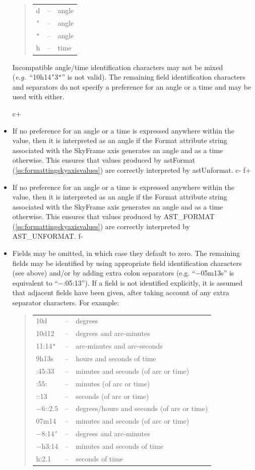 \documentclass[twoside,11pt]{article}
\newcommand{\secref}[1]{\S\ref{#1}}
\renewcommand{\secref}[1]{\ref{#1}}
\begin{document}
\begin{itemize}
\begin{quote}
\begin{tabular}{lll}
d & -- & angle \\
{\tt{'}} & -- & angle \\
{\tt{"}} & -- & angle \\
h & -- & time
\end{tabular}
\end{quote}

Incompatible angle/time identification characters may not be mixed
({\em{e.g.}}\ ``10h14{\tt{'}}3{\tt{"}}'' is not valid).  The remaining
field identification characters and separators do not specify a
preference for an angle or a time and may be used with either.

c+
\item If no preference for an angle or a time is expressed anywhere
within the value, then it is interpreted as an angle if the Format
attribute string associated with the SkyFrame axis generates an angle
and as a time otherwise.  This ensures that values produced by
astFormat (\secref{ss:formattingskyaxisvalues}) are correctly
interpreted by astUnformat.
c-
f+
\item If no preference for an angle or a time is expressed anywhere
within the value, then it is interpreted as an angle if the Format
attribute string associated with the SkyFrame axis generates an angle
and as a time otherwise.  This ensures that values produced by
AST\_FORMAT (\secref{ss:formattingskyaxisvalues}) are correctly
interpreted by AST\_UNFORMAT.
f-

\item Fields may be omitted, in which case they default to zero. The
remaining fields may be identified by using appropriate field
identification characters (see above) and/or by adding extra colon
separators (e.g. ``$-$05m13s'' is equivalent to ``$-$:05:13''). If a field
is not identified explicitly, it is assumed that adjacent fields have
been given, after taking account of any extra separator
characters. For example:

\begin{quote}
\begin{tabular}{lll}
10d & -- & degrees \\
10d12 & -- & degrees and arc-minutes \\
11:14{\tt{"}} & -- & arc-minutes and arc-seconds \\
9h13s & -- & hours and seconds of time \\
:45:33 & -- & minutes and seconds (of arc or time) \\
:55: & -- & minutes (of arc or time) \\
::13 & -- & seconds (of arc or time) \\
$-$6::2.5 & -- & degrees/hours and seconds (of arc or time) \\
07m14 & -- & minutes and seconds (of arc or time) \\
$-$8:14{\tt{'}} & -- & degrees and arc-minutes \\
$-$h3:14 & -- & minutes and seconds of time \\
h:2.1 & -- & seconds of time
\end{tabular}
\end{quote}


\end{itemize}
\end{document}
